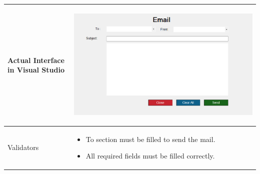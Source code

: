 \documentclass[12pt,a4paper]{article}
\begin{document}
\begin{longtable}{| p{3cm}|p{12cm}|}
Actual Interface in Visual Studio & \begin{center} \includegraphics[scale=0.3]{./User Interface1/UI-012 SendEmail@1x.png}\end{center}  \\ \hline

Validators & 
\begin{itemize}
\item  To section must be filled to send the mail.
\item All required fields must be filled correctly. 


\end{itemize}
\\ \hline

\end{longtable} 
\end{document}
